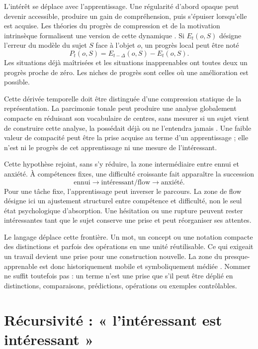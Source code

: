 \documentclass[11pt,a4paper]{article}
\begin{document}
L'intérêt se déplace avec l'apprentissage. Une régularité d'abord opaque peut
devenir accessible, produire un gain de compréhension, puis s'épuiser lorsqu'elle
est acquise. Les théories du progrès de compression et de la motivation
intrinsèque formalisent une version de cette dynamique
\parencite{schmidhuber1997interesting,schmidhuber2009compression,oudeyer2007intrinsic,oudeyer2007typology}.
Si \(E_t(o,S)\) désigne l'erreur du modèle du sujet \(S\) face à l'objet \(o\),
un progrès local peut être noté
\[
  P_t(o,S)=E_{t-\Delta}(o,S)-E_t(o,S).
\]
Les situations déjà maîtrisées et les situations inapprenables ont toutes deux
un progrès proche de zéro. Les niches de progrès sont celles où une amélioration
est possible.

Cette dérivée temporelle doit être distinguée d'une compression statique de la
représentation. La parcimonie tonale peut produire une analyse globalement
compacte en réduisant son vocabulaire de centres, sans mesurer si un sujet vient
de construire cette analyse, la possédait déjà ou ne l'entendra jamais
\parencite{pachet2026tonalparsimony}. Une faible valeur de compacité peut être la
prise acquise au terme d'un apprentissage ; elle n'est ni le progrès de cet
apprentissage ni une mesure de l'intéressant.

Cette hypothèse rejoint, sans s'y réduire, la zone intermédiaire entre ennui et
anxiété. À compétences fixes, une difficulté croissante fait apparaître la
succession
\[
  \text{ennui}\longrightarrow\text{intéressant/flow}
  \longrightarrow\text{anxiété}.
\]
Pour une tâche fixe, l'apprentissage peut inverser le parcours. La zone de flow
désigne ici un ajustement structurel entre compétence et difficulté, non le seul
état psychologique d'absorption. Une hésitation ou une rupture peuvent rester
intéressantes tant que le sujet conserve une prise et peut réorganiser ses
attentes.

Le langage déplace cette frontière. Un mot, un concept ou une notation compacte
des distinctions et parfois des opérations en une unité réutilisable. Ce qui
exigeait un travail devient une prise pour une construction nouvelle. La zone
du presque-apprenable est donc historiquement mobile et symboliquement médiée
\parencite{vygotsky1978mind,lenat1991thresholds,lenat2008turtle,koestler1989act,steels2005coordinating,steels2015talkingheads}.
Nommer ne suffit toutefois pas : un terme n'est une prise que s'il peut être
déplié en distinctions, comparaisons, prédictions, opérations ou exemples
contrôlables.

\section{Récursivité : « l'intéressant est intéressant »}
\end{document}
